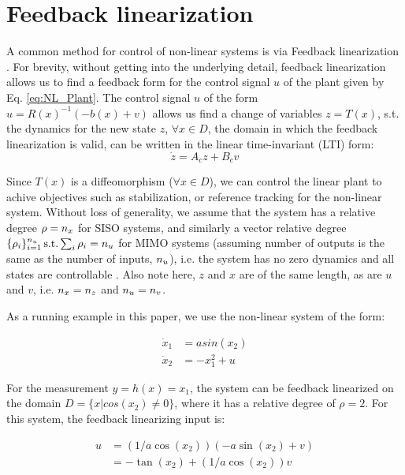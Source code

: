 \section{Feedback linearization}
\label{sec:feedbacklin}
A common method for control of non-linear systems is via Feedback linearization \cite{khalil}. For brevity, without getting into the underlying detail, feedback linearization allows us to find a feedback form for the control signal $u$ of the plant given by Eq. \ref{eq:NL_Plant}. The control signal $u$ of the form $u = R(x)^{-1}(-b(x)+v)$ allows us find a change of variables $z=T(x)$, s.t. the dynamics for the new state $z$, $\forall x \in D$, the domain in which the feedback linearization is valid, can be written in the linear time-invariant (LTI) form:
\begin{equation}
\label{eq:LTI_fb_lin}
\dot{z} = A_cz + B_cv
\end{equation}

Since $T(x)$ is a diffeomorphism ($\forall x \in D$), we can control the linear plant to achive objectives such as stabilization, or reference tracking for the non-linear system. Without loss of generality, we assume that the system has a relative degree $\rho=n_x$ for SISO systems, and similarly a vector relative degree $\lbrace \rho_i \rbrace_{i=1}^{n_u}\, \text{s.t.} \sum_i \rho_i = n_u$ for MIMO systems (assuming number of outputs is the same as the number of inputs, $n_u$), i.e. the system has no zero dynamics and all states are controllable \cite{khalil}. Also note here, $z$ and $x$ are of the same length, as are $u$ and $v$, i.e. $n_x = n_z$ and $n_u = n_v$.


 As a running example in this paper, we use the non-linear system of the form:

\begin{subequations}
\begin{align}
\dot{x}_1 &= asin(x_2) \\
\dot{x}_2 &=-x_1^2 + u 
\end{align}
\end{subequations}

For the measurement $y = h(x) = x_1$, the system can be feedback linearized on the domain $D = \lbrace x | cos(x_2) \neq 0 \rbrace $, where it has a relative degree of $\rho=2$. For this system, the feedback linearizing input is:

\begin{subequations}
\begin{align}
u &= (1/a\cos(x_2))(-a\sin(x_2)+v) \nonumber \\
&= -\tan(x_2) + (1/a\cos(x_2))v
\end{align}
\end{subequations}

